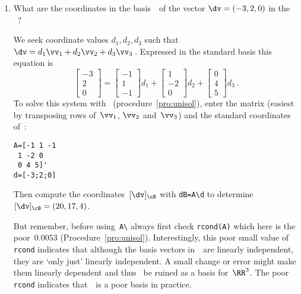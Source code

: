 \begin{example}
\begin{enumerate}
\item What are the coordinates in the basis~\cB\ of the vector \(\dv=(-3,2,0)\) in the ~\cE?
\begin{solution} 
We seek coordinate values \(d_1,d_2,d_3\) such that \(\dv=d_1\vv_1+d_2\vv_2+d_3\vv_3\)\,. 
Expressed in the standard basis this equation is
\begin{equation*}
\begin{bmatrix} -3\\2\\0 \end{bmatrix}=
\begin{bmatrix} -1\\1\\-1 \end{bmatrix}d_1+
\begin{bmatrix} 1\\-2\\0 \end{bmatrix}d_2+
\begin{bmatrix} 0\\4\\5 \end{bmatrix}d_3\,.
\end{equation*}
To solve this system with \script\ (procedure~\ref{pro:unisol}), enter the matrix (easiest by transposing rows of~\(\vv_1\), \(\vv_2\) and~\(\vv_3\)) and the standard coordinates of~\dv:
\begin{verbatim}
A=[-1 1 -1
 1 -2 0
 0 4 5]'
d=[-3;2;0]
\end{verbatim}
\setbox\ajrqrbox\hbox{}%
\marginpar{\usebox{\ajrqrbox}}%
Then compute the coordinates~\([\dv]_\cB\) with \verb|dB=A\d| to determine \([\dv]_\cB=(20,17,4)\).

But remember, before using~\verb|A\| always first check \verb|rcond(A)| which here is the poor~\(0.0053\) (Procedure~\ref{pro:unisol}).
Interestingly, this poor small value of \verb|rcond| indicates that although the basis vectors in~\cB\ are linearly independent, they are `only just' linearly independent.
A small change or error might make them linearly dependent and thus \cB~be ruined as a basis for~\(\RR^3\).
The poor \verb|rcond| indicates that~\cB\ is a poor basis in practice.
\end{solution}
\end{enumerate}
\end{example}





